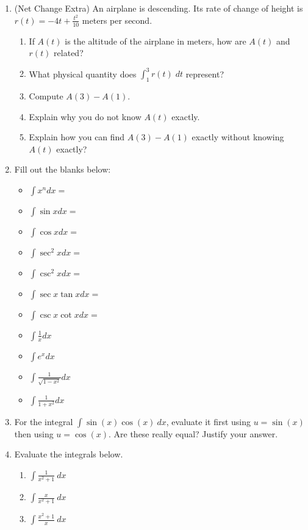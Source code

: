 \documentclass[12pt]{article}
\renewcommand{\d}{\displaystyle}
\newcommand{\ds}{\displaystyle}
\begin{document}
\begin{enumerate}
\item (Net Change Extra) An airplane is descending.  Its rate of change of height
is $\d r(t) = -4 t + \frac{t^2}{10}$ meters per second.  
\begin{enumerate}
\item If $A(t)$ is the altitude of the airplane in meters, 
how are $A(t)$ and $r(t)$ related?
\vfill
\item What physical quantity
does $\d \int_1^3 r(t)\; dt$ represent?
\vfill
\item  Compute $A(3)-A(1)$.
\vfill
\item Explain why you do not know $A(t)$ exactly.
\vfill
\item Explain how you can find $A(3)-A(1)$ exactly without knowing $A(t)$ exactly?
\vfill
\end{enumerate}

\item Fill out the blanks below:\\
 \begin{multicols}{2}
    \begin{itemize}
    \item $\d \int x^n dx = $
    \item $\d \int \sin x dx =$
    \item $\d \int \cos x dx = $
    \item $\d \int \sec^2 x dx =$
    \item $\d \int \csc^2 x dx =$
   
\columnbreak
 \item $\d \int \sec x \tan x dx= $
    \item $\d \int \csc x \cot x dx= $
    \item $\d \int \frac 1 x dx$
    \item $\d \int e^x dx$
    \item $\d \int \frac{1}{\sqrt{1-x^2}} dx$
    \item $\d \int \frac{1}{1+x^2} dx$
    \end{itemize}
  \end{multicols}
  \newpage
\item For the integral $\ds \int \sin(x) \cos(x) \: dx$, evaluate it first using $u=\sin (x)$ then using $u=\cos(x).$ Are these really equal? Justify your answer.
\vfill
\item Evaluate the integrals below. 
\begin{multicols}{3}
	\begin{enumerate}
	\item $\ds{\int \frac{1}{x^2+1} \: dx}$
	\item $\ds{\int \frac{x}{x^2+1} \: dx}$
	\item $\ds{\int \frac{x^2+1}{x} \: dx}$
	\end{enumerate}
\end{multicols}
\vfill


\end{enumerate}
\end{document}
